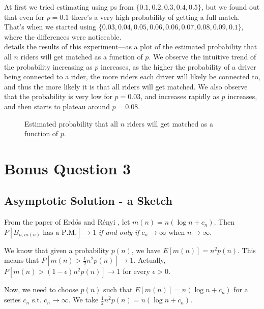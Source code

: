 \documentclass{article}
\begin{document}
\begin{enumerate}[label=(\alph*)]
    At first we tried estimating using ps from $\{0.1, 0.2, 0.3, 0.4, 0.5\}$, but we found out that even for $p=0.1$ there's a very high probability of getting a full match.\\
    That's when we started using $\{0.03, 0.04, 0.05, 0.06, 0.06, 0.07, 0.08, 0.09, 0.1\}$, where the differences were noticeable.\\
    
     details the results of this experiment---as a plot of the estimated probability that all $n$ riders will get matched as a function of $p$. We observe the intuitive trend of the probability increasing as $p$ increases, as the higher the probability of a driver being connected to a rider, the more riders each driver will likely be connected to, and thus the more likely it is that all riders will get matched. We also observe that the probability is very low for $p = 0.03$, and increases rapidly as $p$ increases, and then starts to plateau around $p = 0.08$.
    
    \begin{figure*}[h]
        \centering
        \resizebox{0.6\textwidth}{!}{
            
        }
        \caption{Estimated probability that all $n$ riders will get matched as a function of $p$.}
        \label{fig:q10d}
    \end{figure*}

\end{enumerate}

\section{Bonus Question 3}

\subsection{Asymptotic Solution - a Sketch}\label{sec:bonus3}

From the paper of Erdős and Rényi \cite{frieze2004perfect}, let $m(n) = n(\log n + c_n)$. Then $P[B_{n,m(n)} \text{ has a P.M.}] \to 1$ \textit{if and only if} $c_n \to \infty$ when $n\to \infty$.

We know that given a probability $p(n)$, we have $E[m(n)] = n^2p(n)$. This means that $P[m(n) > \frac{1}{2}n^2p(n)] \to 1$. Actually, $P[m(n) > (1 - \epsilon)n^2p(n)] \to 1$ for every $\epsilon > 0$.

Now, we need to choose $p(n)$ such that $E[m(n)] = n(\log n + c_n)$ for a series $c_n$ s.t. $c_n \to \infty$.  We take $\frac{1}{2}n^2p(n) = n(\log n + c_n)$.
\end{document}
